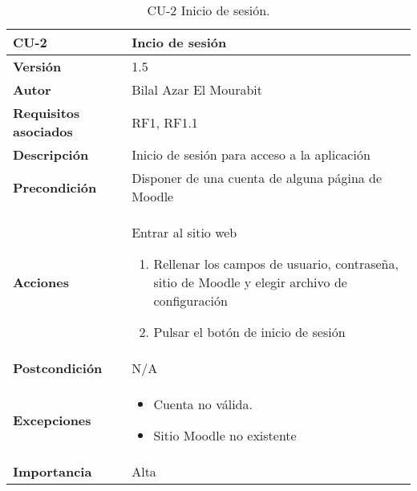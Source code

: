 \begin{table}[H]
	\centering
	\begin{tabularx}{\linewidth}{ p{} p{} }
		\toprule
		\textbf{CU-2}    & \textbf{Incio de sesión}\\
		\toprule
		\textbf{Versión}              & 1.5    \\
		\textbf{Autor}                & Bilal Azar El Mourabit \\
		\textbf{Requisitos asociados} & RF1, RF1.1 \\
		\textbf{Descripción}          & Inicio de sesión para acceso a la aplicación \\
    		\textbf{Precondición}         & Disponer de una cuenta de alguna página de Moodle  \\
		\textbf{Acciones}             & Entrar al sitio web
		\begin{enumerate}
			\def\labelenumi{\arabic{enumi}.}
			\tightlist
			\item Rellenar los campos de usuario, contraseña, sitio de Moodle y elegir archivo de configuración
			\item Pulsar el botón de inicio de sesión
		\end{enumerate}\\
		\textbf{Postcondición}        & N/A  \\
		\textbf{Excepciones}          & \begin{itemize}
		    \item Cuenta no válida.
            \item Sitio Moodle no existente
		\end{itemize} \\
		\textbf{Importancia}          & Alta \\
		\bottomrule
	\end{tabularx}
	\caption{CU-2 Inicio de sesión.}
\end{table}

